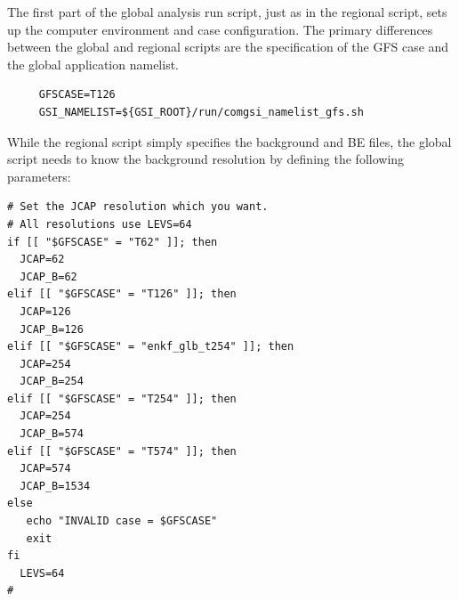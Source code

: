 The first part of the global analysis run script, just as in the regional script, sets up the computer environment and case configuration. The primary 
differences between the global and regional scripts are the specification of the GFS case and the global application namelist.
\begin{small}
\begin{verbatim}
     GFSCASE=T126
     GSI_NAMELIST=${GSI_ROOT}/run/comgsi_namelist_gfs.sh
\end{verbatim}
\end{small}
While the regional script simply specifies the background and BE files, the global script needs to know the background resolution by defining the 
following parameters:
\begin{scriptsize}
\begin{verbatim}
# Set the JCAP resolution which you want.
# All resolutions use LEVS=64
if [[ "$GFSCASE" = "T62" ]]; then
  JCAP=62
  JCAP_B=62
elif [[ "$GFSCASE" = "T126" ]]; then
  JCAP=126
  JCAP_B=126
elif [[ "$GFSCASE" = "enkf_glb_t254" ]]; then
  JCAP=254
  JCAP_B=254
elif [[ "$GFSCASE" = "T254" ]]; then
  JCAP=254
  JCAP_B=574
elif [[ "$GFSCASE" = "T574" ]]; then
  JCAP=574
  JCAP_B=1534
else
   echo "INVALID case = $GFSCASE"
   exit
fi
  LEVS=64
#
\end{verbatim}
\end{scriptsize}

